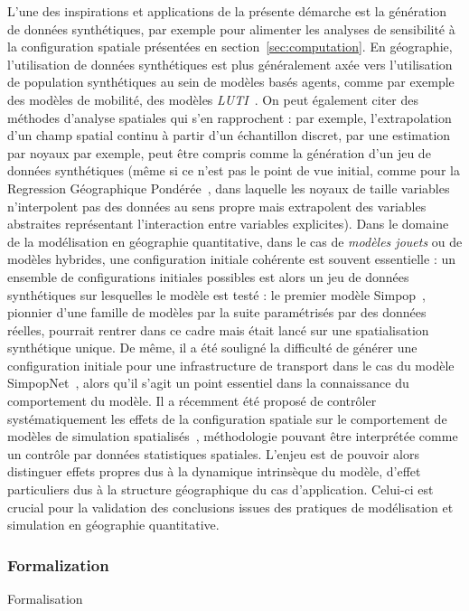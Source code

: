 {L'une des inspirations et applications de la présente démarche est la génération de données synthétiques, par exemple pour alimenter les analyses de sensibilité à la configuration spatiale présentées en section~\ref{sec:computation}. En géographie, l'utilisation de données synthétiques est plus généralement axée vers l'utilisation de population synthétiques au sein de modèles basés agents, comme par exemple des modèles de mobilité, des modèles \emph{LUTI}~\cite{pritchard2009advances}. On peut également citer des méthodes d'analyse spatiales qui s'en rapprochent : par exemple, l'extrapolation d'un champ spatial continu à partir d'un échantillon discret, par une estimation par noyaux par exemple, peut être compris comme la génération d'un jeu de données synthétiques (même si ce n'est pas le point de vue initial, comme pour la Regression Géographique Pondérée~\cite{brunsdon1998geographically}, dans laquelle les noyaux de taille variables n'interpolent pas des données au sens propre mais extrapolent des variables abstraites représentant l'interaction entre variables explicites). Dans le domaine de la modélisation en géographie quantitative, dans le cas de \emph{modèles jouets} ou de modèles hybrides, une configuration initiale cohérente est souvent essentielle : un ensemble de configurations initiales possibles est alors un jeu de données synthétiques sur lesquelles le modèle est testé : le premier modèle Simpop~\cite{sanders1997simpop}, pionnier d'une famille de modèles par la suite paramétrisés par des données réelles, pourrait rentrer dans ce cadre mais était lancé sur une spatialisation synthétique unique. De même, il a été souligné la difficulté de générer une configuration initiale pour une infrastructure de transport dans le cas du modèle SimpopNet~\cite{schmitt2014modelisation}, alors qu'il s'agit un point essentiel dans la connaissance du comportement du modèle. Il a récemment été proposé de contrôler systématiquement les effets de la configuration spatiale sur le comportement de modèles de simulation spatialisés~\cite{cottineau2015revisiting}, méthodologie pouvant être interprétée comme un contrôle par données statistiques spatiales. L'enjeu est de pouvoir alors distinguer effets propres dus à la dynamique intrinsèque du modèle, d'effet particuliers dus à la structure géographique du cas d'application. Celui-ci est crucial pour la validation des conclusions issues des pratiques de modélisation et simulation en géographie quantitative.
}



\subsubsection{Formalization}{Formalisation}


